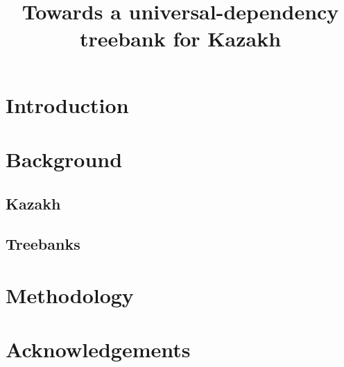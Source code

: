 \documentclass[a4paper,11pt,twocolumn]{article}
\title{Towards a universal-dependency treebank for Kazakh}
\begin{document}
\maketitleabstract{}


\section{Introduction}

\section{Background}

\subsection{Kazakh}

\subsection{Treebanks}

\section{Methodology}



\section*{Acknowledgements}
\end{document}
